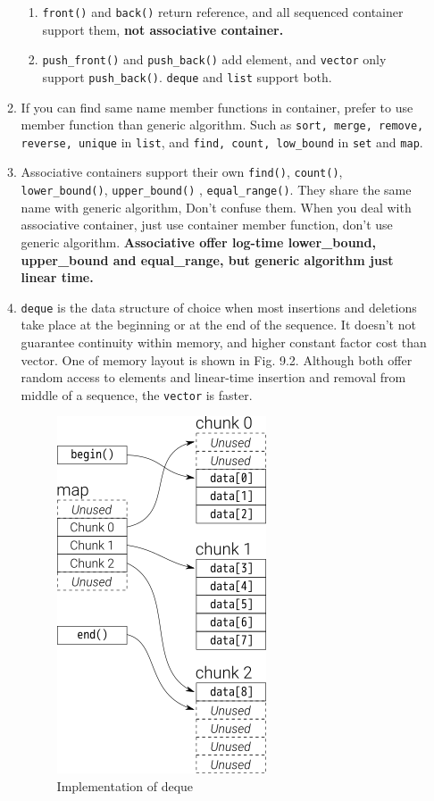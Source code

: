 \documentclass[a4paper,11pt,twoside]{book}
\begin{document}
\begin{itemize}
\begin{enumerate}
\begin{enumerate}
\item \texttt{front()} and \texttt{back()} return reference, and all sequenced container support them, \textbf{not associative container.}

\item \texttt{push\_front()} and \texttt{push\_back()} add element, and \texttt{vector} only support \texttt{push\_back()}. \texttt{deque} and \texttt{list} support both.
\end{enumerate}

\item  If you can find same name member functions in container, prefer to use member function than generic algorithm. Such as \texttt{sort, merge, remove, reverse, unique} in \texttt{list}, and \texttt{find, count, low\_bound} in \texttt{set} and \texttt{map}. 

\item Associative containers support their own \texttt{find()}, \texttt{count()},  \texttt{lower\_bound()}, \texttt{upper\_bound()} , \texttt{equal\_range()}. They share the same name with generic algorithm, Don't confuse them. When you deal with associative container, just use container member function, don't use generic algorithm. \textbf{Associative offer log-time lower\_bound, upper\_bound and equal\_range, but generic algorithm just linear time.}


\item \texttt{deque} is the data structure of choice when most insertions and deletions take place at the beginning or at the end of the sequence. It doesn't not guarantee continuity within memory, and higher constant factor cost than vector. One of memory layout is shown in Fig. 9.2.  Although both offer random access to elements and linear-time insertion and removal from middle of a sequence, the \texttt{vector} is faster.  

\begin{figure}[ht]
	\centering
	\includegraphics[width=0.2\linewidth]{pics/queue.png}
	\caption{Implementation of deque}
	\label{fig:queue}
\end{figure}



\end{enumerate}
\end{itemize}
\end{document}
